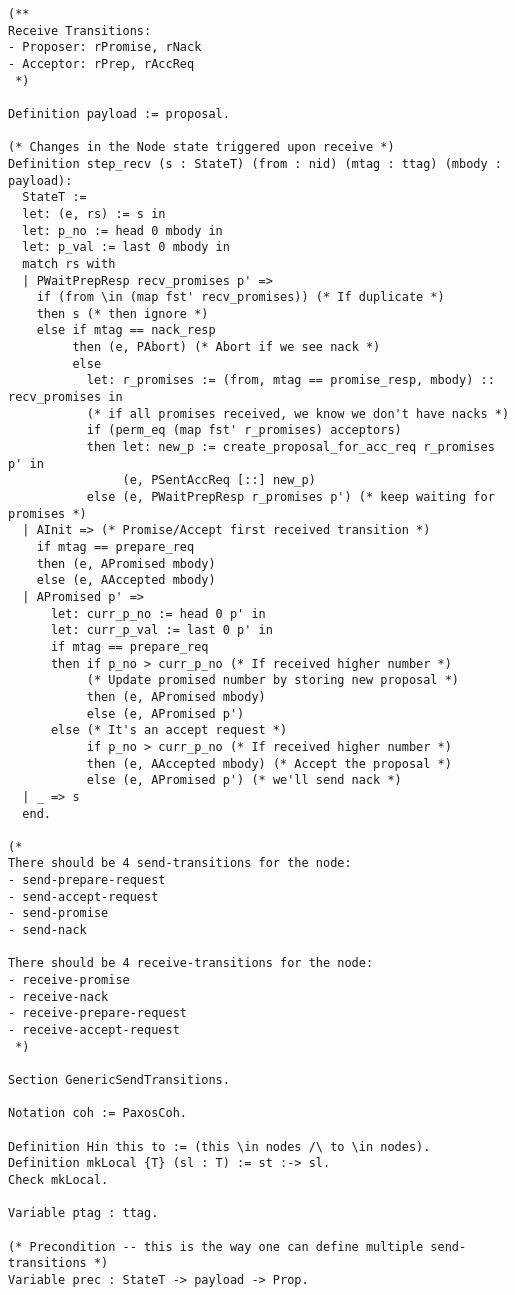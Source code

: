 \begin{landscape}
\begin{multicols*}{2}
\begin{lstlisting}[style=SourceCodeListing]
(**
Receive Transitions:
- Proposer: rPromise, rNack
- Acceptor: rPrep, rAccReq
 *)

Definition payload := proposal.

(* Changes in the Node state triggered upon receive *)
Definition step_recv (s : StateT) (from : nid) (mtag : ttag) (mbody : payload):
  StateT :=
  let: (e, rs) := s in
  let: p_no := head 0 mbody in
  let: p_val := last 0 mbody in
  match rs with
  | PWaitPrepResp recv_promises p' =>
    if (from \in (map fst' recv_promises)) (* If duplicate *)
    then s (* then ignore *)
    else if mtag == nack_resp
         then (e, PAbort) (* Abort if we see nack *)
         else
           let: r_promises := (from, mtag == promise_resp, mbody) :: recv_promises in
           (* if all promises received, we know we don't have nacks *)
           if (perm_eq (map fst' r_promises) acceptors)
           then let: new_p := create_proposal_for_acc_req r_promises p' in
                (e, PSentAccReq [::] new_p)
           else (e, PWaitPrepResp r_promises p') (* keep waiting for promises *)
  | AInit => (* Promise/Accept first received transition *)
    if mtag == prepare_req
    then (e, APromised mbody)
    else (e, AAccepted mbody)
  | APromised p' =>
      let: curr_p_no := head 0 p' in
      let: curr_p_val := last 0 p' in
      if mtag == prepare_req
      then if p_no > curr_p_no (* If received higher number *)
           (* Update promised number by storing new proposal *)
           then (e, APromised mbody)
           else (e, APromised p')
      else (* It's an accept request *)
           if p_no > curr_p_no (* If received higher number *)
           then (e, AAccepted mbody) (* Accept the proposal *)
           else (e, APromised p') (* we'll send nack *)
  | _ => s
  end.

(*
There should be 4 send-transitions for the node:
- send-prepare-request
- send-accept-request
- send-promise
- send-nack

There should be 4 receive-transitions for the node:
- receive-promise
- receive-nack
- receive-prepare-request
- receive-accept-request
 *)

Section GenericSendTransitions.

Notation coh := PaxosCoh.

Definition Hin this to := (this \in nodes /\ to \in nodes).
Definition mkLocal {T} (sl : T) := st :-> sl.
Check mkLocal.

Variable ptag : ttag.

(* Precondition -- this is the way one can define multiple send-transitions *)
Variable prec : StateT -> payload -> Prop.


\end{lstlisting}
\end{multicols*}
\end{landscape}
